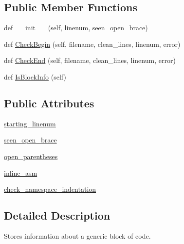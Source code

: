 \subsection*{Public Member Functions}
\begin{DoxyCompactItemize}
\item 
def \hyperlink{classcpplint_1_1__BlockInfo_ab1663260e978a348a4ff2ab9d7324587}{\+\_\+\+\_\+init\+\_\+\+\_\+} (self, linenum, \hyperlink{classcpplint_1_1__BlockInfo_aa974539217437751383ad20896c974d7}{seen\+\_\+open\+\_\+brace})
\item 
def \hyperlink{classcpplint_1_1__BlockInfo_af316a9e3623b45bd07079166be67582c}{Check\+Begin} (self, filename, clean\+\_\+lines, linenum, error)
\item 
def \hyperlink{classcpplint_1_1__BlockInfo_ae504a3429de136eebf85f32fcae6a8ca}{Check\+End} (self, filename, clean\+\_\+lines, linenum, error)
\item 
def \hyperlink{classcpplint_1_1__BlockInfo_ab3e06a94a38d7397ce6a4faa094010d4}{Is\+Block\+Info} (self)
\end{DoxyCompactItemize}
\subsection*{Public Attributes}
\begin{DoxyCompactItemize}
\item 
\hyperlink{classcpplint_1_1__BlockInfo_a81d316f03e42aebbfe0636f905c4c291}{starting\+\_\+linenum}
\item 
\hyperlink{classcpplint_1_1__BlockInfo_aa974539217437751383ad20896c974d7}{seen\+\_\+open\+\_\+brace}
\item 
\hyperlink{classcpplint_1_1__BlockInfo_a02a0b48995a599f6b2bbaa6f16cca98a}{open\+\_\+parentheses}
\item 
\hyperlink{classcpplint_1_1__BlockInfo_aad762ef7088f2f556a75c9a80006f4db}{inline\+\_\+asm}
\item 
\hyperlink{classcpplint_1_1__BlockInfo_a120822b07db37b3480a573ec29ee4457}{check\+\_\+namespace\+\_\+indentation}
\end{DoxyCompactItemize}


\subsection{Detailed Description}
\begin{DoxyVerb}Stores information about a generic block of code.\end{DoxyVerb}
 

